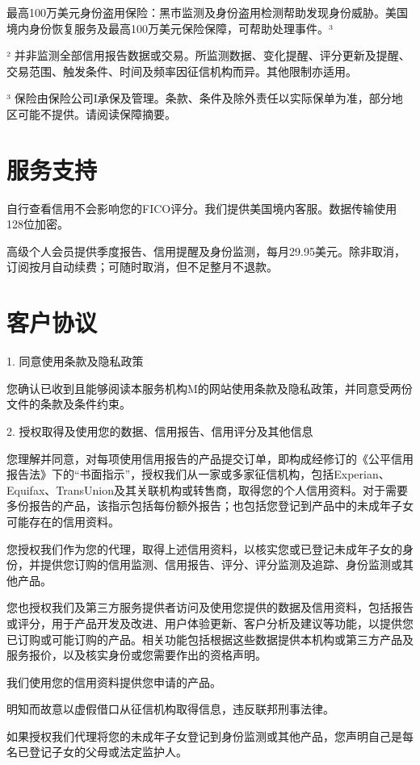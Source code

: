 \documentclass[UTF8,fontset=none,11pt,a4paper]{ctexart}
\begin{document}
最高100万美元身份盗用保险：黑市监测及身份盗用检测帮助发现身份威胁。美国境内身份恢复服务及最高100万美元保险保障，可帮助处理事件。³


² 并非监测全部信用报告数据或交易。所监测数据、变化提醒、评分更新及提醒、交易范围、触发条件、时间及频率因征信机构而异。其他限制亦适用。


³ 保险由保险公司I承保及管理。条款、条件及除外责任以实际保单为准，部分地区可能不提供。请阅读保障摘要。


\section*{服务支持}
自行查看信用不会影响您的FICO评分。我们提供美国境内客服。数据传输使用128位加密。


高级个人会员提供季度报告、信用提醒及身份监测，每月29.95美元。除非取消，订阅按月自动续费；可随时取消，但不足整月不退款。


\section*{客户协议}
1. 同意使用条款及隐私政策


您确认已收到且能够阅读本服务机构M的网站使用条款及隐私政策，并同意受两份文件的条款及条件约束。


2. 授权取得及使用您的数据、信用报告、信用评分及其他信息


您理解并同意，对每项使用信用报告的产品提交订单，即构成经修订的《公平信用报告法》下的“书面指示”，授权我们从一家或多家征信机构，包括Experian、Equifax、TransUnion及其关联机构或转售商，取得您的个人信用资料。对于需要多份报告的产品，该指示包括每份额外报告；也包括您登记到产品中的未成年子女可能存在的信用资料。


您授权我们作为您的代理，取得上述信用资料，以核实您或已登记未成年子女的身份，并提供您订购的信用监测、信用报告、评分、评分监测及追踪、身份监测或其他产品。


您也授权我们及第三方服务提供者访问及使用您提供的数据及信用资料，包括报告或评分，用于产品开发及改进、用户体验更新、客户分析及建议等功能，以提供您已订购或可能订购的产品。相关功能包括根据这些数据提供本机构或第三方产品及服务报价，以及核实身份或您需要作出的资格声明。


我们使用您的信用资料提供您申请的产品。


明知而故意以虚假借口从征信机构取得信息，违反联邦刑事法律。


如果授权我们代理将您的未成年子女登记到身份监测或其他产品，您声明自己是每名已登记子女的父母或法定监护人。
\end{document}
